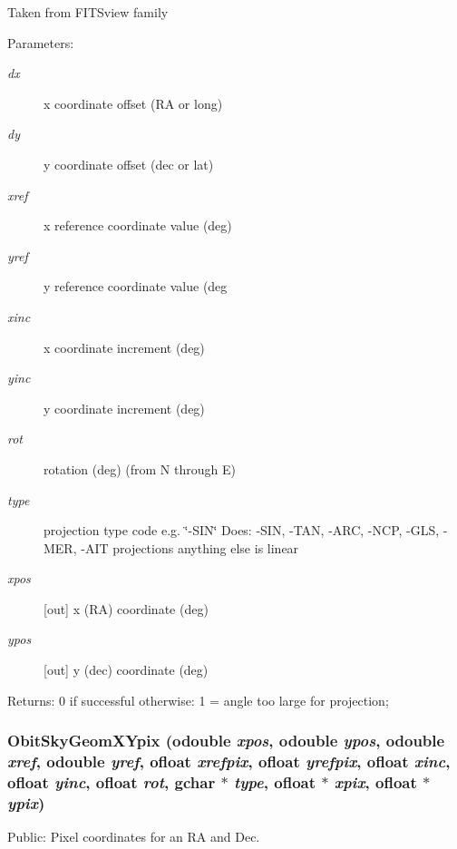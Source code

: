 Taken from FITSview family \begin{Desc}
\item[Parameters:]
\begin{description}
\item[{\em dx}]x coordinate offset (RA or long) \item[{\em dy}]y coordinate offset (dec or lat) \item[{\em xref}]x reference coordinate value (deg) \item[{\em yref}]y reference coordinate value (deg \item[{\em xinc}]x coordinate increment (deg) \item[{\em yinc}]y coordinate increment (deg) \item[{\em rot}]rotation (deg) (from N through E) \item[{\em type}]projection type code e.g. \char`\"{}-SIN\char`\"{} Does: -SIN, -TAN, -ARC, -NCP, -GLS, -MER, -AIT projections anything else is linear \item[{\em xpos}][out] x (RA) coordinate (deg) \item[{\em ypos}][out] y (dec) coordinate (deg) \end{description}
\end{Desc}
\begin{Desc}
\item[Returns:]0 if successful otherwise: 1 = angle too large for projection; \end{Desc}
\subsubsection{ Obit\-Sky\-Geom\-XYpix ({\bf odouble} {\em xpos}, {\bf odouble} {\em ypos}, {\bf odouble} {\em xref}, {\bf odouble} {\em yref}, {\bf ofloat} {\em xrefpix}, {\bf ofloat} {\em yrefpix}, {\bf ofloat} {\em xinc}, {\bf ofloat} {\em yinc}, {\bf ofloat} {\em rot}, gchar $\ast$ {\em type}, {\bf ofloat} $\ast$ {\em xpix}, {\bf ofloat} $\ast$ {\em ypix})}\label{ObitSkyGeom_8h_a15}


Public: Pixel coordinates for an RA and Dec. 


